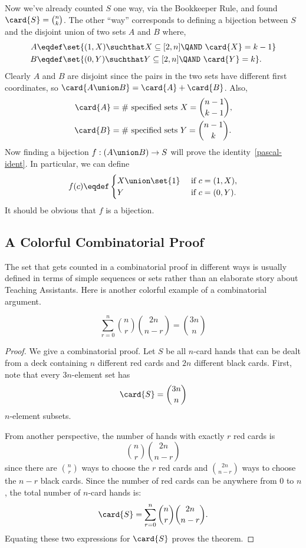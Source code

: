 Now we've already counted $S$ one way, via the Bookkeeper Rule, and
found $\card{S} = \binom{n}{k}$.  The other ``way'' corresponds to
defining a bijection between $S$ and the disjoint union of two sets
$A$ and $B$ where,
\begin{align*}
A & \eqdef \set{(1,X) \suchthat X \subseteq [2,n] \QAND\ \card{X}=k-1}\\
B & \eqdef \set{(0,Y) \suchthat Y \subseteq [2,n] \QAND\ \card{Y}=k}.
\end{align*}
Clearly $A$ and $B$ are disjoint since the pairs in the two sets have
different first coordinates, so $\card{A \union B} = \card{A} +
\card{B}$.  Also,
\begin{align*}
\card{A} & = \text{\# specified sets $X$} =  \binom{n-1}{k-1},\\
\card{B} & = \text{\# specified sets $Y$} = \binom{n-1}{k}.
\end{align*}
Now finding a bijection $f:(A \union B) \to S$ will prove the
identity~\eqref{pascal-ident}.  In particular, we can define
\[
f(c) \eqdef \begin{cases} X \union \set{1} &\text{ if } c = (1,X),\\
                          Y  &\text{ if } c = (0,Y).
\end{cases}
\]
It should be obvious that $f$ is a bijection.

\subsection{A Colorful Combinatorial Proof} 

The set that gets counted in a combinatorial proof in different ways
is usually defined in terms of simple sequences or sets rather than an
elaborate story about Teaching Assistants.  Here is another colorful
example of a combinatorial argument.

\begin{theorem}
\label{th:comb-ex}
\[
\sum_{r=0}^n \binom{n}{r} \binom{2n}{n-r} = \binom{3n}{n}
\]
\end{theorem}

\begin{proof}
We give a combinatorial proof.  Let $S$ be all $n$-card hands that can
be dealt from a deck containing $n$ different red cards and $2n$
different black cards.  First, note that every $3n$-element set has
%
\[
\card{S} = \binom{3n}{n}
\]
%
$n$-element subsets.

From another perspective, the number of hands with exactly $r$ red
cards is
%
\[
\binom{n}{r} \binom{2n}{n - r}
\]
%
since there are $\binom{n}{r}$ ways to choose the $r$ red cards and
$\binom{2n}{n - r}$ ways to choose the $n - r$ black cards.  Since the
number of red cards can be anywhere from 0 to $n$, the total number of
$n$-card hands is:
%
\[
    \card{S} = \sum_{r=0}^n \binom{n}{r} \binom{2n}{n-r}.
\]
%
Equating these two expressions for $\card{S}$ proves the theorem.
\end{proof}

